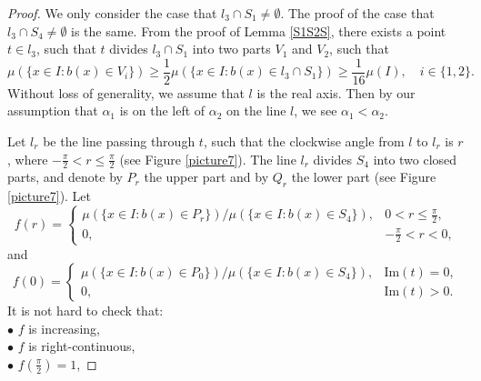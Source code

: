 \documentclass[oneside,english,a4wide]{amsart}
\numberwithin{equation}{section}
\numberwithin{figure}{section}
\theoremstyle{plain}
\theoremstyle{plain}
\theoremstyle{definition}
\theoremstyle{plain}
\theoremstyle{remark}
\theoremstyle{definition}
\theoremstyle{remark}
\theoremstyle{definition}
\newcommand{\8}{\infty}
\begin{document}
\begin{proof}
	We only consider the case that $l_3\cap S_1\neq \emptyset$. The proof of the case that $l_3\cap S_4\neq \emptyset$ is the same. From the proof of Lemma \ref{S1S2S}, there exists a point $t\in l_3$, such that $t$ divides $l_3\cap S_1$ into two parts $V_{1}$ and $V_{2}$, such that
	\begin{equation*}
		\mu(\{x\in I:b(x)\in V_i\})\ge \frac{1}{2}\mu(\{x\in I:b(x)\in l_{3}\cap S_1\})\ge \frac{1}{16}\mu(I),\quad i\in\{1,2\}.
	\end{equation*}
	Without loss of generality, we assume that $l$ is the real axis. Then by our assumption that $\alpha_1$ is on the left of $\alpha_2$ on the line $l$, we see $\alpha_1< \alpha_2$. 
	
	Let $l_r$ be the line passing through $t$, such that the clockwise angle from $l$ to $l_r$ is $r$, where $-\frac{\pi}{2}< r \le \frac{\pi}{2}$ (see Figure \ref{picture7}). The line $l_r$ divides $S_4$ into two closed parts, and denote by $P_r$ the upper part and by $Q_r$ the lower part (see Figure \ref{picture7}). Let
	\begin{equation*}
		f(r)=
		\begin{cases}
			\mu(\{x\in I:b(x)\in P_r\})\big/\mu(\{x\in I:b(x)\in S_4\}),&  0< r \le \frac{\pi}{2},\\
			0, & -\frac{\pi}{2}<r< 0,
		\end{cases}
	\end{equation*}
	and
	\begin{equation*}
		f(0)=\begin{cases}
			\mu(\{x\in I:b(x)\in P_0\})\big/\mu(\{x\in I:b(x)\in S_4\}), &\mathrm{Im}(t)=0,\\
			0, &\mathrm{Im}(t)>0.
			\end{cases}
		\end{equation*}
	It is not hard to check that:\\
     $\bullet$ $f$ is increasing,\\
     $\bullet$ $f$ is right-continuous,\\
	 $\bullet$ $f(\frac{\pi}{2})=1$,


\end{proof}
\end{document}
